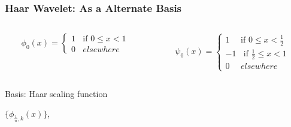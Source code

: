     \begin{frame}
    \frametitle{Haar Wavelet: As a Alternate Basis}
    \vspace{-2 mm}
          \begin{columns}[T]
            \begin{column}{.5\textwidth}

                \begin{equation}\label{eq:qlmwphi0}
                \phi_0(x)=
                \left\{
                    \begin{array}{ll}
                        1  ~~~~  \mbox{if } 0 \leq x < 1 \\
                        0 ~~~~  elsewhere
                    \end{array}
                \right.
                \nonumber
                \end{equation}

        \end{column}
        \begin{column}{.5\textwidth}

              \begin{equation}
              \psi_0(x)=
              \left\{
                  \begin{array}{ll}
                      1 ~~~~~~  \mbox{if } 0 \leq x < \frac{1}{2} \\
                      -1 ~~~~  \mbox{if } \frac{1}{2} \leq x < 1 \\
                      0 ~~~~~~  elsewhere
                  \end{array}
              \right.
              \nonumber
              \end{equation}

        \end{column}
      \end{columns}

        \vspace{9 mm}

          \begin{columns}[T]
            \begin{column}{.5\textwidth}
                
                 Basis: Haar scaling function 
        \vspace{0.5cm}

                 \centering
                  $\{  \phi_{\frac{1}{n},k}(x)\}$,\\
        \vspace{0.2cm}


\end{column}
\end{columns}
\end{frame}
